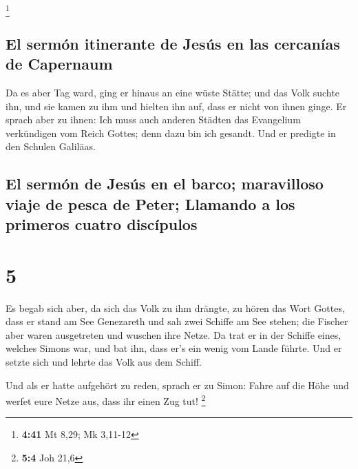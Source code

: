 \footnote{\textbf{4:41} Mt 8,29; Mk 3,11-12}

\hypertarget{el-sermuxf3n-itinerante-de-jesuxfas-en-las-cercanuxedas-de-capernaum}{%
\subsection{El sermón itinerante de Jesús en las cercanías de
Capernaum}\label{el-sermuxf3n-itinerante-de-jesuxfas-en-las-cercanuxedas-de-capernaum}}

 Da es aber Tag ward, ging er hinaus an eine wüste
Stätte; und das Volk suchte ihn, und sie kamen zu ihm und hielten ihn
auf, dass er nicht von ihnen ginge.  Er sprach aber zu
ihnen: Ich muss auch anderen Städten das Evangelium verkündigen vom
Reich Gottes; denn dazu bin ich gesandt.  Und er predigte
in den Schulen Galiläas.

\hypertarget{el-sermuxf3n-de-jesuxfas-en-el-barco-maravilloso-viaje-de-pesca-de-peter-llamando-a-los-primeros-cuatro-discuxedpulos}{%
\subsection{El sermón de Jesús en el barco; maravilloso viaje de pesca
de Peter; Llamando a los primeros cuatro
discípulos}\label{el-sermuxf3n-de-jesuxfas-en-el-barco-maravilloso-viaje-de-pesca-de-peter-llamando-a-los-primeros-cuatro-discuxedpulos}}

\hypertarget{section-4}{%
\section{5}\label{section-4}}

 Es begab sich aber, da sich das Volk zu ihm drängte, zu
hören das Wort Gottes, dass er stand am See Genezareth 
und sah zwei Schiffe am See stehen; die Fischer aber waren ausgetreten
und wuschen ihre Netze.  Da trat er in der Schiffe eines,
welches Simons war, und bat ihn, dass er's ein wenig vom Lande führte.
Und er setzte sich und lehrte das Volk aus dem Schiff.

 Und als er hatte aufgehört zu reden, sprach er zu Simon:
Fahre auf die Höhe und werfet eure Netze aus, dass ihr einen Zug tut!
\footnote{\textbf{5:4} Joh 21,6}

